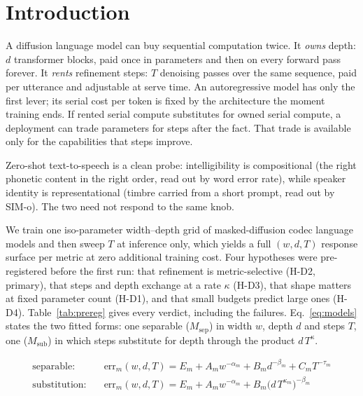 \documentclass{article}
\begin{document}
\section{Introduction}
A diffusion language model can buy sequential computation twice. It \emph{owns} depth:
$d$ transformer blocks, paid once in parameters and then on every forward pass forever.
It \emph{rents} refinement steps: $T$ denoising passes over the same sequence, paid per
utterance and adjustable at serve time. An autoregressive model has only the first lever;
its serial cost per token is fixed by the architecture the moment training ends. If rented
serial compute substitutes for owned serial compute, a deployment can trade parameters for
steps after the fact. That trade is available only for the capabilities that steps improve.

Zero-shot text-to-speech is a clean probe: intelligibility is compositional (the right
phonetic content in the right order, read out by word error rate), while speaker identity is
representational (timbre carried from a short prompt, read out by SIM-o). The two need not
respond to the same knob.

We train one iso-parameter width--depth grid of masked-diffusion codec language models and
then sweep $T$ at inference only, which yields a full $(w, d, T)$ response surface per metric
at zero additional training cost. Four hypotheses were pre-registered before the first run:
that refinement is metric-selective (H-D2, primary), that steps and depth exchange at a rate
$\kappa$ (H-D3), that shape matters at fixed parameter count (H-D1), and that small budgets
predict large ones (H-D4). Table~\ref{tab:prereg} gives every verdict, including the failures.
Eq.~\eqref{eq:models} states the two fitted forms: one separable ($M_{\mathrm{sep}}$) in width $w$, depth $d$ and steps $T$,
one ($M_{\mathrm{sub}}$) in which steps substitute for depth through the product $d\,T^{\kappa}$.

\begin{equation}
\label{eq:models}
\begin{aligned}
\text{separable:}\quad &\mathrm{err}_m(w,d,T) = E_m + A_m w^{-\alpha_m} + B_m d^{-\beta_m} + C_m T^{-\tau_m}\\[-1pt]
\text{substitution:}\quad &\mathrm{err}_m(w,d,T) = E_m + A_m w^{-\alpha_m} + B_m \big(d\,T^{\kappa_m}\big)^{-\beta_m}
\end{aligned}
\end{equation}
\end{document}
